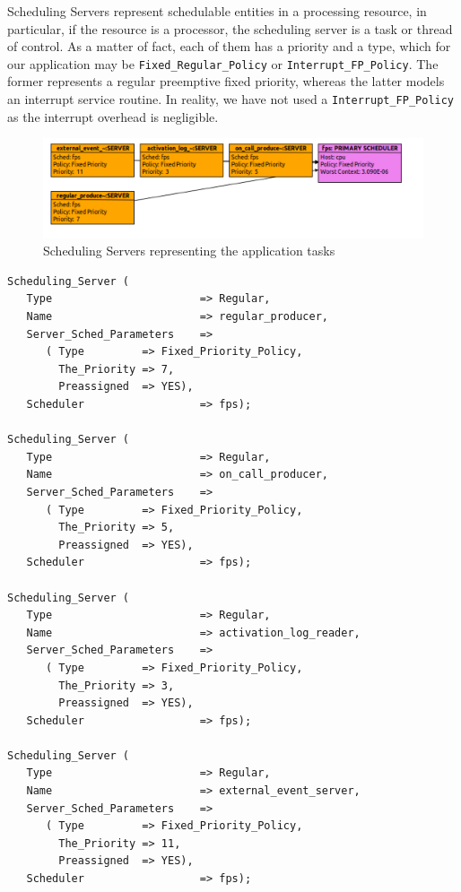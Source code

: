 \documentclass{article}
\begin{document}
Scheduling Servers represent schedulable entities in a processing resource, in particular, if the resource is a processor, the scheduling server is a task or thread of control. As a matter of fact, each of them has a priority and a type, which for our application may be \texttt{Fixed\_Regular\_Policy} or \texttt{Interrupt\_FP\_Policy}. The former represents a regular preemptive fixed priority, whereas the latter models an interrupt service routine. In reality, we have not used a \texttt{Interrupt\_FP\_Policy} as the interrupt overhead is negligible.

\begin{figure}[!htbp]
\centering
\includegraphics[width=5in]{images/scheduling-servers}
\caption{Scheduling Servers representing the application tasks}
\label{scheduling-servers}
\end{figure}

\begin{lstlisting}
Scheduling_Server (
   Type                       => Regular,
   Name                       => regular_producer,
   Server_Sched_Parameters    =>
      ( Type         => Fixed_Priority_Policy,
        The_Priority => 7,
        Preassigned  => YES),
   Scheduler                  => fps);

Scheduling_Server (
   Type                       => Regular,
   Name                       => on_call_producer,
   Server_Sched_Parameters    =>
      ( Type         => Fixed_Priority_Policy,
        The_Priority => 5,
        Preassigned  => YES),
   Scheduler                  => fps);

Scheduling_Server (
   Type                       => Regular,
   Name                       => activation_log_reader,
   Server_Sched_Parameters    =>
      ( Type         => Fixed_Priority_Policy,
        The_Priority => 3,
        Preassigned  => YES),
   Scheduler                  => fps);

Scheduling_Server (
   Type                       => Regular,
   Name                       => external_event_server,
   Server_Sched_Parameters    =>
      ( Type         => Fixed_Priority_Policy,
        The_Priority => 11,
        Preassigned  => YES),
   Scheduler                  => fps);
\end{lstlisting}
\end{document}
